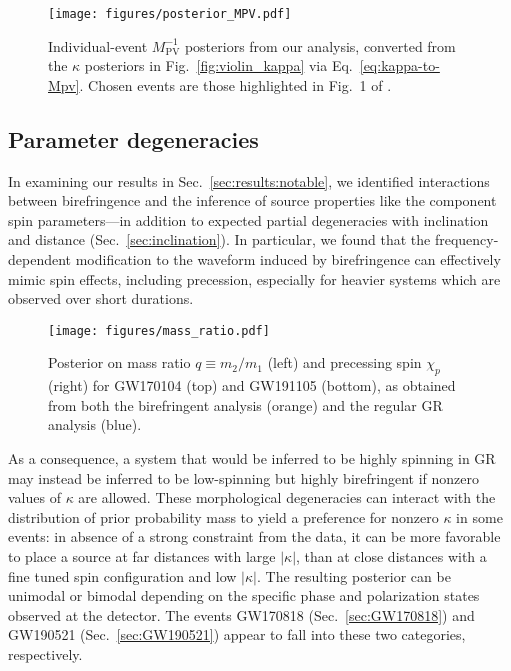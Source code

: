 \documentclass[aps,prd,twocolumn,superscriptaddress,preprintnumbers,nofootinbib]{revtex4-2}
\begin{document}
\begin{figure}
    \texttt{[image: figures/posterior\_MPV.pdf]}
    \caption{
        Individual-event $M_\mathrm{PV}^{-1}$ posteriors from our analysis, converted from the $\kappa$ posteriors in Fig.~\ref{fig:violin_kappa} via Eq.~\eqref{eq:kappa-to-Mpv}.
        Chosen events are those highlighted in Fig.~1 of \citet{Zhu:2023wci}.
    }
    \label{fig:posterior_MPV}
\end{figure}

\subsection{Parameter degeneracies}
\label{sec:degeneracies}

In examining our results in Sec.~\ref{sec:results:notable}, we identified interactions between birefringence and the inference of source properties like the component spin parameters---in addition to expected partial degeneracies with inclination and distance (Sec.~\ref{sec:inclination}).
In particular, we found that the frequency-dependent modification to the waveform induced by birefringence can effectively mimic spin effects, including precession, especially for heavier systems which are observed over short durations.

\begin{figure}
    \texttt{[image: figures/mass\_ratio.pdf]}
    \caption{
    Posterior on mass ratio $q \equiv m_2/m_1$ (left) and precessing spin $\chi_p$ (right) for GW170104 (top) and GW191105 (bottom), as obtained from both the birefringent analysis (orange) and the regular \ac{GR} analysis (blue).
    }
    \label{fig:mass_ratio}
\end{figure}

As a consequence, a system that would be inferred to be highly spinning in \ac{GR} may instead be inferred to be low-spinning but highly birefringent if nonzero values of $\kappa$ are allowed.
These morphological degeneracies can interact with the distribution of prior probability mass to yield a preference for nonzero $\kappa$ in some events: in absence of a strong constraint from the data, it can be more favorable to place a source at far distances with large $|\kappa|$, than at close distances with a fine tuned spin configuration and low $|\kappa|$.
The resulting posterior can be unimodal or bimodal depending on the specific phase and polarization states observed at the detector.
The events GW170818 (Sec.~\ref{sec:GW170818}) and GW190521 (Sec.~\ref{sec:GW190521}) appear to fall into these two categories, respectively.
\end{document}
